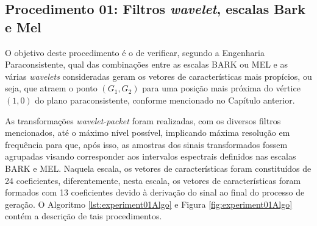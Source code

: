 		\subsection{Procedimento 01: Filtros \textit{wavelet}, escalas Bark e Mel}
		\label{chap:propApproach:sec:Experimento01}
		\par O objetivo deste procedimento é o de verificar, segundo a Engenharia Paraconsistente, qual das combinações entre as escalas BARK ou MEL e as várias \textit{wavelets} consideradas geram os vetores de características mais propícios, ou seja, que atraem o ponto $(G_1,G_2)$ para uma posição mais próxima do vértice $(1,0)$ do plano paraconsistente, conforme mencionado no Capítulo anterior. 
				
		\par As transformações \textit{wavelet-packet} foram realizadas, com os diversos filtros mencionados, até  o máximo nível possível, implicando máxima resolução em frequência para que, após isso, as amostras dos sinais transformados fossem agrupadas visando corresponder aos intervalos espectrais definidos nas escalas BARK e MEL. Naquela escala, os vetores de características foram constituídos de 24 coeficientes, diferentemente, nesta escala, os vetores de características foram formados com 13 coeficientes devido à derivação do sinal ao final do processo de geração. O Algoritmo \ref{lst:experiment01Algo} e Figura \ref{fig:experiment01Algo} contém a descrição de tais procedimentos.

		
			
